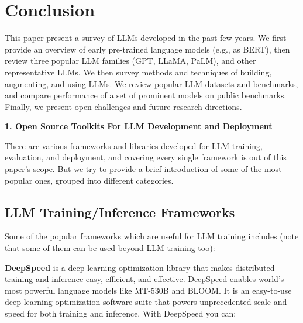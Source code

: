 \documentclass[conference]{IEEEtran}
\begin{document}
\section{Conclusion}
This paper present a survey of LLMs developed in the past few years.
We first provide an overview of early pre-trained language models (e.g., as BERT), then review three popular LLM families (GPT, LLaMA, PaLM), and other representative LLMs. 
We then survey methods and techniques of building, augmenting, and using LLMs.
We review popular LLM datasets and benchmarks, and compare performance of a set of prominent models on public benchmarks.
Finally, we present open challenges and future research directions.


\iffalse
\section*{Acknowledgment}
The authors would like to thank 
\fi








\appendix
\textbf{1. Open Source Toolkits For LLM Development and Deployment}
\label{sec:LLM_tools}


There are various frameworks and libraries developed for LLM training, evaluation, and deployment, and covering every single framework is out of this paper's scope. But we try to provide a brief introduction of some of the most popular ones, grouped into different categories.


\subsection{LLM Training/Inference Frameworks}
Some of the popular frameworks which are useful for LLM training includes (note that some of them can be used beyond LLM training too):


\textbf{DeepSpeed} 
\cite{deepspeed} is a deep learning optimization library that makes distributed training and inference easy, efficient, and effective.
DeepSpeed enables world's most powerful language models like MT-530B and BLOOM. It is an easy-to-use deep learning optimization software suite that powers unprecedented scale and speed for both training and inference. With DeepSpeed you can:
\end{document}
